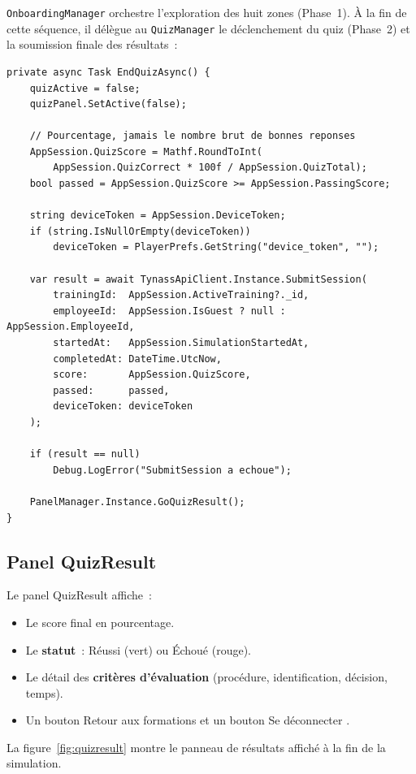 \texttt{OnboardingManager} orchestre l'exploration des huit zones (Phase~1). À la
fin de cette séquence, il délègue au \texttt{QuizManager} le déclenchement du quiz
(Phase~2) et la soumission finale des résultats~:

\begin{lstlisting}[language={[Sharp]C}, caption={QuizManager --- fin du quiz et SubmitSession}]
private async Task EndQuizAsync() {
    quizActive = false;
    quizPanel.SetActive(false);

    // Pourcentage, jamais le nombre brut de bonnes reponses
    AppSession.QuizScore = Mathf.RoundToInt(
        AppSession.QuizCorrect * 100f / AppSession.QuizTotal);
    bool passed = AppSession.QuizScore >= AppSession.PassingScore;

    string deviceToken = AppSession.DeviceToken;
    if (string.IsNullOrEmpty(deviceToken))
        deviceToken = PlayerPrefs.GetString("device_token", "");

    var result = await TynassApiClient.Instance.SubmitSession(
        trainingId:  AppSession.ActiveTraining?._id,
        employeeId:  AppSession.IsGuest ? null : AppSession.EmployeeId,
        startedAt:   AppSession.SimulationStartedAt,
        completedAt: DateTime.UtcNow,
        score:       AppSession.QuizScore,
        passed:      passed,
        deviceToken: deviceToken
    );

    if (result == null)
        Debug.LogError("SubmitSession a echoue");

    PanelManager.Instance.GoQuizResult();
}
\end{lstlisting}

\subsection{Panel QuizResult}

Le panel QuizResult affiche~:
\begin{itemize}
  \item Le score final en pourcentage.
  \item Le \textbf{statut}~: \og Réussi \fg{} (vert) ou \og Échoué \fg{} (rouge).
  \item Le détail des \textbf{critères d'évaluation} (procédure, identification,
    décision, temps).
  \item Un bouton \og Retour aux formations \fg{} et un bouton \og Se déconnecter \fg{}.
\end{itemize}

La figure~\ref{fig:quizresult} montre le panneau de résultats affiché à la
fin de la simulation.

